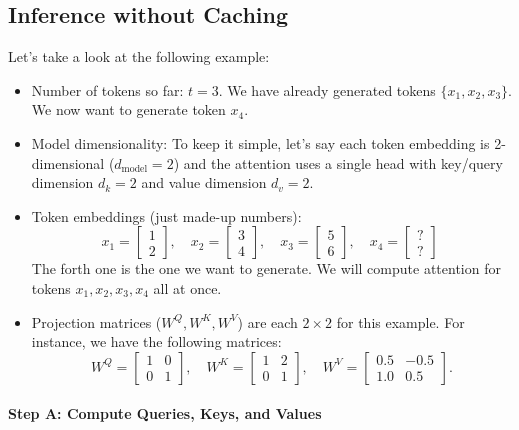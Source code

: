\subsection{Inference without Caching}

Let's take a look at the following example:
\begin{itemize}
	\item Number of tokens so far: \(t=3\). We have already generated tokens \(\{x_1, x_2, x_3\}\). We now want to generate token \(x_4\).  
	\item Model dimensionality: To keep it simple, let's say each token embedding is 2-dimensional (\(d_{\text{model}} = 2\)) and the attention uses a single head with key/query dimension \(d_k = 2\) and value dimension \(d_v = 2\). 
	\item Token embeddings (just made-up numbers):
	  \[
		x_1 = \begin{bmatrix}1 \\ 2\end{bmatrix}, \quad
		x_2 = \begin{bmatrix}3 \\ 4\end{bmatrix}, \quad
		x_3 = \begin{bmatrix}5 \\ 6\end{bmatrix}, \quad
		x_4 = \begin{bmatrix}? \\ ?\end{bmatrix} \; 
	  \]
	  The forth one is the one we want to generate. We will compute attention for tokens \(x_1, x_2, x_3, x_4\) all at once.  
  \item Projection matrices (\(W^Q, W^K, W^V\)) are each \(2 \times 2\) for this example. For instance, we have the following matrices:
  \[
    W^Q = \begin{bmatrix}1 & 0 \\[6pt] 0 & 1\end{bmatrix}, \quad
    W^K = \begin{bmatrix}1 & 2 \\[6pt] 0 & 1\end{bmatrix}, \quad
    W^V = \begin{bmatrix}0.5 & -0.5 \\[6pt] 1.0 & 0.5\end{bmatrix}.
  \]
\end{itemize}

\paragraph{Step A: Compute Queries, Keys, and Values}


